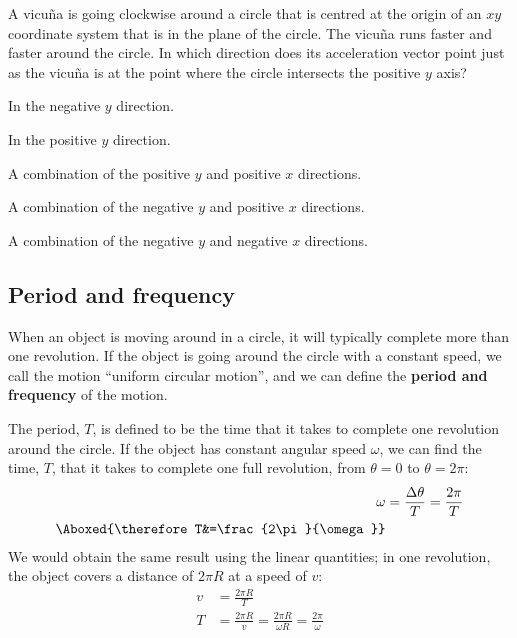 \begin{checkpoint}{\begin{MCquestion}{A vicu\~na is going clockwise around a circle that is centred at the origin of an $xy$ coordinate system that is in the plane of the circle. The vicu\~na runs faster and faster around the circle. In which direction does its acceleration vector point just as the vicu\~na is at the point where the circle intersects the positive $y$ axis?}
\item In the negative $y$ direction.
\item In the positive $y$ direction.
\item A combination of the positive $y$ and positive $x$ directions.
\item A combination of the negative $y$ and positive $x$ directions. %
\item A combination of the negative $y$ and negative $x$ directions.
\end{MCquestion}}
\end{checkpoint}

\subsection{Period and frequency}
When an object is moving around in a circle, it will typically complete more than one revolution. If the object is going around the circle with a constant speed, we call the motion ``uniform circular motion'', and we can define the \textbf{period and frequency} of the motion. 

The period, $T$, is defined to be the time that it takes to complete one revolution around the circle. If the object has constant angular speed $\omega$, we can find the time, $T$, that it takes to complete one full revolution, from $\theta=0$ to $\theta=2\pi$:
\begin{align}
\omega&=\frac{\Delta \theta}{T}=\frac{2\pi}{T}\nonumber\\
\Aboxed{\therefore T&=\frac{2\pi}{\omega}}
\end{align}
We would obtain the same result using the linear quantities; in one revolution, the object covers a distance of $2\pi R$ at a speed of $v$:
\begin{align*}
v&=\frac{2\pi R}{T}\\
T&=\frac{2\pi R}{v}=\frac{2\pi R}{\omega R}=\frac{2\pi}{\omega}
\end{align*}

